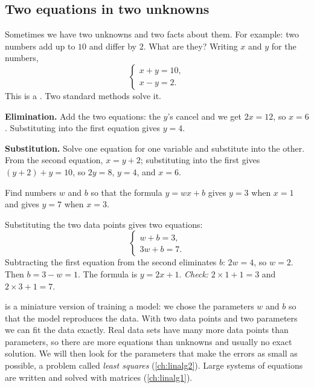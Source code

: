 \subsection{Two equations in two unknowns}

Sometimes we have two unknowns and two facts about them. For example: two
numbers add up to $10$ and differ by $2$. What are they? Writing $x$ and $y$
for the numbers,
\[
  \begin{cases}
    x + y = 10,\\
    x - y = 2.
  \end{cases}
\]
This is a . Two
standard methods solve it.

\textbf{Elimination.} Add the two equations: the $y$'s cancel and we get
$2x = 12$, so $x = 6$. Substituting into the first equation gives $y = 4$.

\textbf{Substitution.} Solve one equation for one variable and substitute
into the other. From the second equation, $x = y + 2$; substituting into the
first gives $(y + 2) + y = 10$, so $2y = 8$, $y = 4$, and $x = 6$.

\begin{example}\label{ex:line-two-points}
Find numbers $w$ and $b$ so that the formula $y = wx + b$ gives $y = 3$ when
$x = 1$ and gives $y = 7$ when $x = 3$.

\sol Substituting the two data points gives two equations:
\[
  \begin{cases}
    w + b = 3,\\
    3w + b = 7.
  \end{cases}
\]
Subtracting the first equation from the second eliminates $b$: $2w = 4$, so
$w = 2$. Then $b = 3 - w = 1$. The formula is $y = 2x + 1$.
\emph{Check:} $2\times1+1 = 3$ and $2\times3+1 = 7$. \checkmark
\end{example}

\begin{mlnote}
 is a miniature version of training a model: we
chose the parameters $w$ and $b$ so that the model reproduces the data. With
two data points and two parameters we can fit the data exactly. Real data sets
have many more data points than parameters, so there are more equations than
unknowns and usually no exact solution. We will then look for the parameters
that make the errors as small as possible, a problem called \emph{least
squares} (\cref{ch:linalg2}). Large systems of equations are written and
solved with matrices (\cref{ch:linalg1}).
\end{mlnote}

